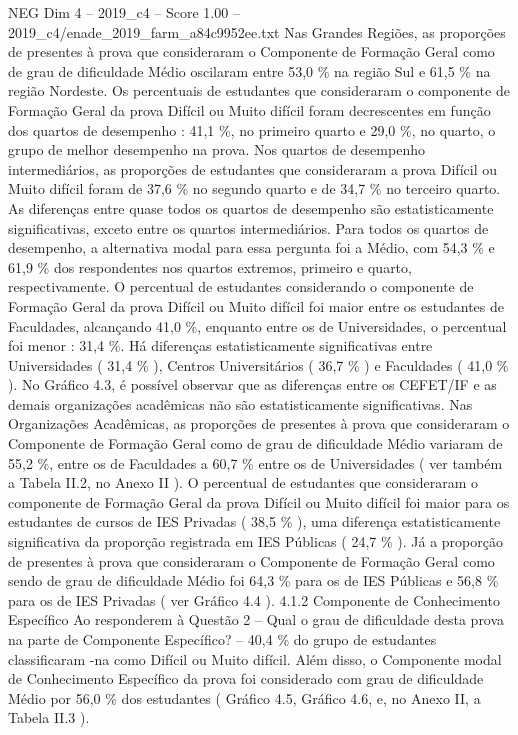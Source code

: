 \begin{textsample}{NEG Dim 4 – 2019\_c4 – Score 1.00 – 2019\_c4/enade\_2019\_farm\_a84c9952ee.txt}
Nas Grandes Regiões, as proporções de presentes à prova que consideraram o Componente de Formação Geral como de grau de dificuldade Médio oscilaram entre 53,0 \% na região Sul e 61,5 \% na região Nordeste.
Os percentuais de estudantes que consideraram o componente de Formação Geral da prova Difícil ou Muito difícil foram decrescentes em função dos quartos de desempenho : 41,1 \%, no primeiro quarto e 29,0 \%, no quarto, o grupo de melhor desempenho na prova.
Nos quartos de desempenho intermediários, as proporções de estudantes que consideraram a prova Difícil ou Muito difícil foram de 37,6 \% no segundo quarto e de 34,7 \% no terceiro quarto.
As diferenças entre quase todos os quartos de desempenho são estatisticamente significativas, exceto entre os quartos intermediários.
Para todos os quartos de desempenho, a alternativa modal para essa pergunta foi a Médio, com 54,3 \% e 61,9 \% dos respondentes nos quartos extremos, primeiro e quarto, respectivamente.
O percentual de estudantes considerando o componente de Formação Geral da prova Difícil ou Muito difícil foi maior entre os estudantes de Faculdades, alcançando 41,0 \%, enquanto entre os de Universidades, o percentual foi menor : 31,4 \%.
Há diferenças estatisticamente significativas entre Universidades ( 31,4 \% ), Centros Universitários ( 36,7 \% ) e Faculdades ( 41,0 \% ).
No Gráfico 4.3, é possível observar que as diferenças entre os CEFET/IF e as demais organizações acadêmicas não são estatisticamente significativas.
Nas Organizações Acadêmicas, as proporções de presentes à prova que consideraram o Componente de Formação Geral como de grau de dificuldade Médio variaram de 55,2 \%, entre os de Faculdades a 60,7 \% entre os de Universidades ( ver também a Tabela II.2, no Anexo II ).
O percentual de estudantes que consideraram o componente de Formação Geral da prova Difícil ou Muito difícil foi maior para os estudantes de cursos de IES Privadas ( 38,5 \% ), uma diferença estatisticamente significativa da proporção registrada em IES Públicas ( 24,7 \% ).
Já a proporção de presentes à prova que consideraram o Componente de Formação Geral como sendo de grau de dificuldade Médio foi 64,3 \% para os de IES Públicas e 56,8 \% para os de IES Privadas ( ver Gráfico 4.4 ). 4.1.2 Componente de Conhecimento Específico Ao responderem à Questão 2 – Qual o grau de dificuldade desta prova na parte de Componente Específico? – 40,4 \% do grupo de estudantes classificaram -na como Difícil ou Muito difícil.
Além disso, o Componente modal de Conhecimento Específico da prova foi considerado com grau de dificuldade Médio por 56,0 \% dos estudantes ( Gráfico 4.5, Gráfico 4.6, e, no Anexo II, a Tabela II.3 ).

\end{textsample}
